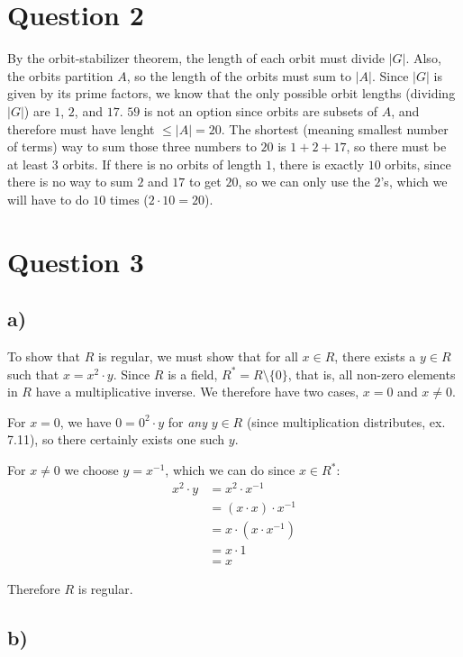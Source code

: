 \documentclass[a4paper,12pt]{article}
\begin{document}
\newpage
\section*{Question 2}
By the orbit-stabilizer theorem, the length of each orbit must divide $|G|$. Also, the orbits partition $A$, so the length of the orbits must sum to $|A|$. Since $|G|$ is given by its prime factors, we know that the only possible orbit lengths (dividing $|G|$) are $1$, $2$, and $17$. $59$ is not an option since orbits are subsets of $A$, and therefore must have lenght $\leq |A| = 20$. The shortest (meaning smallest number of terms) way to sum those three numbers to $20$ is $1 + 2 + 17$, so there must be at least $3$ orbits. If there is no orbits of length $1$, there is exactly $10$ orbits, since there is no way to sum $2$ and $17$ to get $20$, so we can only use the $2$'s, which we will have to do $10$ times ($2 \cdot 10 = 20$).

\section*{Question 3}


\subsection*{a)}

To show that $R$ is regular, we must show that for all $x \in R$, there exists a $y \in R$ such that $x = x^2 \cdot y$. Since $R$ is a field, $R^* = R \setminus \{0\}$, that is, all non-zero elements in $R$ have a multiplicative inverse. We therefore have two cases, $x = 0$ and $x \neq 0$.

For $x = 0$, we have $0 = 0^2 \cdot y$ for \emph{any} $y \in R$ (since multiplication distributes, ex. 7.11), so there certainly exists one such $y$.

For $x \neq 0$ we choose $y = x^{-1}$, which we can do since $x \in R^*$:
\begin{align*}
    x^2 \cdot y &= x^2 \cdot x^{-1} \\
    &= (x \cdot x) \cdot x^{-1} \\
    &= x \cdot (x \cdot x^{-1}) \\
    &= x \cdot 1 \\
    &= x
\end{align*}

Therefore $R$ is regular. 

\subsection*{b)}
\end{document}
